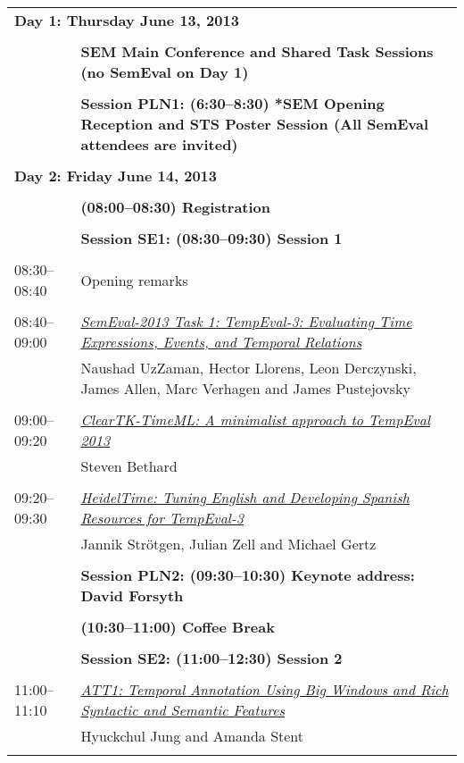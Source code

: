 \begin{tabular}{p{20mm}p{128mm}}
\\
\multicolumn{2}{l}{\bf Day 1: Thursday June 13, 2013} \\
\\
 & {\bf *SEM Main Conference and Shared Task Sessions (no SemEval on Day 1)} \\
\\
 & {\bf Session PLN1: (6:30--8:30) *SEM Opening Reception and STS Poster Session (All SemEval attendees are invited)} \\
\\

\multicolumn{2}{l}{\bf Day 2: Friday June 14, 2013} \\
\\
 & {\bf (08:00--08:30) Registration} \\
\\
 & {\bf Session SE1: (08:30--09:30) Session 1} \\
\\
08:30--08:40 & Opening remarks \\
\\
08:40--09:00 & \hyperlink{page.1}{\em SemEval-2013 Task 1: TempEval-3: Evaluating Time Expressions, Events, and Temporal Relations}\\
         & Naushad UzZaman, Hector Llorens, Leon Derczynski, James Allen, Marc Verhagen and James Pustejovsky \\
\\

09:00--09:20 & \hyperlink{page.10}{\em ClearTK-TimeML: A minimalist approach to TempEval 2013}\\
         & Steven Bethard \\
\\

09:20--09:30 & \hyperlink{page.15}{\em HeidelTime: Tuning English and Developing Spanish  Resources for TempEval-3}\\
         & Jannik Str\"{o}tgen, Julian Zell and Michael Gertz \\
\\

 & {\bf Session PLN2: (09:30--10:30) Keynote address: David Forsyth} \\
\\
 & {\bf (10:30--11:00) Coffee Break} \\
\\
 & {\bf Session SE2: (11:00--12:30) Session 2} \\
\\
11:00--11:10 & \hyperlink{page.20}{\em ATT1: Temporal Annotation Using Big Windows and Rich Syntactic and Semantic Features}\\
         & Hyuckchul Jung and Amanda Stent \\
\\


\end{tabular}
